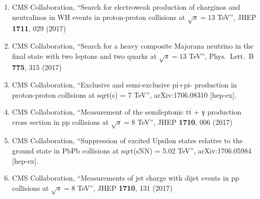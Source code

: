 \begin{enumerate}
\item CMS Collaboration, ``Search for electroweak production of charginos and neutralinos in WH events in proton-proton collisions at $ \sqrt{s}=13 $ TeV'', JHEP {\bf 1711}, 029 (2017)

\item CMS Collaboration, ``Search for a heavy composite Majorana neutrino in the final state with two leptons and two quarks at $\sqrt{s}=13$ TeV'', Phys.\ Lett.\ B {\bf 775}, 315 (2017)

\item CMS Collaboration, ``Exclusive and semi-exclusive pi+pi- production in proton-proton collisions at sqrt(s) = 7 TeV'', arXiv:1706.08310 [hep-ex].

\item CMS Collaboration, ``Measurement of the semileptonic $ \mathrm{t}\overline{\mathrm{t}} $ + γ production cross section in pp collisions at $ \sqrt{s}=8 $ TeV'', JHEP {\bf 1710}, 006 (2017)

\item CMS Collaboration, ``Suppression of excited Upsilon states relative to the ground state in PbPb collisions at sqrt(sNN) = 5.02 TeV'', arXiv:1706.05984 [hep-ex].

\item CMS Collaboration, ``Measurements of jet charge with dijet events in pp collisions at $\sqrt{s}=8$ TeV'', JHEP {\bf 1710}, 131 (2017)


\end{enumerate}
